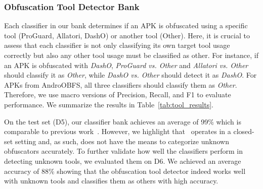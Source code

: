 \subsubsection{{Obfuscation Tool Detector Bank}}

Each classifier in our bank determines if an APK is obfuscated using a specific tool (ProGuard, Allatori, DashO) or another tool (Other). Here, it is crucial to assess that each classifier is not only classifying its own target tool usage correctly but also any other tool usage must be classified as other. For instance, if an APK is obfuscated with \emph{DashO}, \textit{ProGuard vs. Other} and \textit{Allatori vs. Other} should classify it as \emph{Other}, while \textit{DashO vs. Other} should detect it as \emph{DashO}. For APKs from AndroOBFS, all three classifiers should classify them as \emph{Other}. Therefore, we use macro versions of Precision, Recall, and F1 to evaluate performance. We summarize the results in Table~\ref{tab:tool_results}.


On the test set (D5), our classifier bank achieves an average of 99\% which is comparable to previous work~\cite{wang2017changed}. However, we highlight that~\cite{wang2017changed} operates in a closed-set setting and, as such, does not have the means to categorize unknown obfuscators accurately. To further validate how well the classifiers perform in detecting unknown tools, we evaluated them on D6. We achieved an average accuracy of 88\% showing that the obfuscation tool detector indeed works well with unknown tools and classifies them as others with high accuracy.


\begin{table}[h]
\caption{Obfuscation tool detection - Results}
\label{tab:tool_results}
\end{table}

